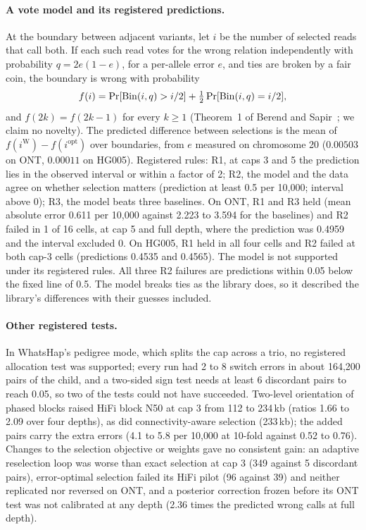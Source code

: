 \paragraph{A vote model and its registered predictions.} At the boundary
between adjacent variants, let $i$ be the number of selected reads that call
both. If each such read votes for the wrong relation independently with
probability $q=2e(1-e)$, for a per-allele error $e$, and ties are broken by a
fair coin, the boundary is wrong with probability
\[
f(i)=\Pr[\mathrm{Bin}(i,q)>i/2]+\tfrac12\Pr[\mathrm{Bin}(i,q)=i/2],
\]
and $f(2k)=f(2k-1)$ for every $k\ge1$ (Theorem~1 of Berend and
Sapir~\cite{berend2005}; we claim no novelty). The predicted difference
between selections is the mean of $f(i^{\mathrm{W}})-f(i^{\mathrm{opt}})$
over boundaries, from $e$ measured on chromosome 20 ($0.00503$ on ONT,
$0.00011$ on HG005). Registered rules: R1, at caps 3 and 5 the prediction
lies in the observed interval or within a factor of 2; R2, the model and the
data agree on whether selection matters (prediction at least 0.5 per
10{,}000; interval above 0); R3, the model beats three baselines. On ONT, R1
and R3 held (mean absolute error 0.611 per 10{,}000 against 2.223 to 3.594
for the baselines) and R2 failed in 1 of 16 cells, at cap 5 and full depth,
where the prediction was 0.4959 and the interval excluded 0. On HG005, R1
held in all four cells and R2 failed at both cap-3 cells (predictions 0.4535
and 0.4565). The model is not supported under its registered rules. All
three R2 failures are predictions within 0.05 below the fixed line of 0.5.
The model breaks ties as the library does, so it described the library's
differences with their guesses included.

\paragraph{Other registered tests.} In WhatsHap's pedigree mode, which splits
the cap across a trio, no registered allocation test was supported; every
run had 2 to 8 switch errors in about 164{,}200 pairs of the child, and a
two-sided sign test needs at least 6 discordant pairs to reach 0.05, so two
of the tests could not have succeeded. Two-level orientation of phased
blocks raised HiFi block N50 at cap 3 from 112 to 234\,kb (ratios 1.66 to
2.09 over four depths), as did connectivity-aware selection (233\,kb); the
added pairs carry the extra errors (4.1 to 5.8 per 10{,}000 at 10-fold
against 0.52 to 0.76). Changes to the selection objective or weights gave no
consistent gain: an adaptive reselection loop was worse than exact selection
at cap 3 (349 against 5 discordant pairs), error-optimal selection failed its
HiFi pilot (96 against 39) and neither replicated nor reversed on ONT, and a
posterior correction frozen before its ONT test was not calibrated at any
depth (2.36 times the predicted wrong calls at full depth).

